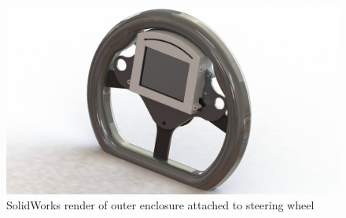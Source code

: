 \begin{figure}[H]
\begin{center}
\includegraphics[width=12cm]{Figures/device_render_wheel.jpg}
\end{center}
\caption{SolidWorks render of outer enclosure attached to steering wheel}
\label{fig:device_render_wheel}
\end{figure}
